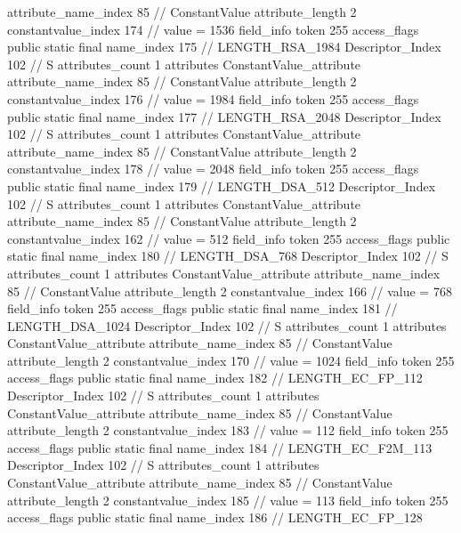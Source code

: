 {{{{{{{					attribute_name_index	85		// ConstantValue
					attribute_length	2
					constantvalue_index	174		// value = 1536
				}
				}
			}
			field_info {
				token	255
				access_flags	public static final
				name_index	175		// LENGTH_RSA_1984
				Descriptor_Index	102		// S
				attributes_count	1
				attributes {
				ConstantValue_attribute {
					attribute_name_index	85		// ConstantValue
					attribute_length	2
					constantvalue_index	176		// value = 1984
				}
				}
			}
			field_info {
				token	255
				access_flags	public static final
				name_index	177		// LENGTH_RSA_2048
				Descriptor_Index	102		// S
				attributes_count	1
				attributes {
				ConstantValue_attribute {
					attribute_name_index	85		// ConstantValue
					attribute_length	2
					constantvalue_index	178		// value = 2048
				}
				}
			}
			field_info {
				token	255
				access_flags	public static final
				name_index	179		// LENGTH_DSA_512
				Descriptor_Index	102		// S
				attributes_count	1
				attributes {
				ConstantValue_attribute {
					attribute_name_index	85		// ConstantValue
					attribute_length	2
					constantvalue_index	162		// value = 512
				}
				}
			}
			field_info {
				token	255
				access_flags	public static final
				name_index	180		// LENGTH_DSA_768
				Descriptor_Index	102		// S
				attributes_count	1
				attributes {
				ConstantValue_attribute {
					attribute_name_index	85		// ConstantValue
					attribute_length	2
					constantvalue_index	166		// value = 768
				}
				}
			}
			field_info {
				token	255
				access_flags	public static final
				name_index	181		// LENGTH_DSA_1024
				Descriptor_Index	102		// S
				attributes_count	1
				attributes {
				ConstantValue_attribute {
					attribute_name_index	85		// ConstantValue
					attribute_length	2
					constantvalue_index	170		// value = 1024
				}
				}
			}
			field_info {
				token	255
				access_flags	public static final
				name_index	182		// LENGTH_EC_FP_112
				Descriptor_Index	102		// S
				attributes_count	1
				attributes {
				ConstantValue_attribute {
					attribute_name_index	85		// ConstantValue
					attribute_length	2
					constantvalue_index	183		// value = 112
				}
				}
			}
			field_info {
				token	255
				access_flags	public static final
				name_index	184		// LENGTH_EC_F2M_113
				Descriptor_Index	102		// S
				attributes_count	1
				attributes {
				ConstantValue_attribute {
					attribute_name_index	85		// ConstantValue
					attribute_length	2
					constantvalue_index	185		// value = 113
				}
				}
			}
			field_info {
				token	255
				access_flags	public static final
				name_index	186		// LENGTH_EC_FP_128
}}}}}
